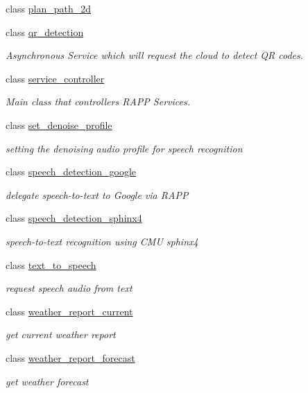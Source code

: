 \begin{DoxyCompactItemize}
\item 
class \hyperlink{classrapp_1_1cloud_1_1plan__path__2d}{plan\-\_\-path\-\_\-2d}
\item 
class \hyperlink{classrapp_1_1cloud_1_1qr__detection}{qr\-\_\-detection}
\begin{DoxyCompactList}\small\item\em Asynchronous Service which will request the cloud to detect Q\-R codes. \end{DoxyCompactList}\item 
class \hyperlink{classrapp_1_1cloud_1_1service__controller}{service\-\_\-controller}
\begin{DoxyCompactList}\small\item\em Main class that controllers R\-A\-P\-P Services. \end{DoxyCompactList}\item 
class \hyperlink{classrapp_1_1cloud_1_1set__denoise__profile}{set\-\_\-denoise\-\_\-profile}
\begin{DoxyCompactList}\small\item\em setting the denoising audio profile for speech recognition \end{DoxyCompactList}\item 
class \hyperlink{classrapp_1_1cloud_1_1speech__detection__google}{speech\-\_\-detection\-\_\-google}
\begin{DoxyCompactList}\small\item\em delegate speech-\/to-\/text to Google via R\-A\-P\-P \end{DoxyCompactList}\item 
class \hyperlink{classrapp_1_1cloud_1_1speech__detection__sphinx4}{speech\-\_\-detection\-\_\-sphinx4}
\begin{DoxyCompactList}\small\item\em speech-\/to-\/text recognition using C\-M\-U sphinx4 \end{DoxyCompactList}\item 
class \hyperlink{classrapp_1_1cloud_1_1text__to__speech}{text\-\_\-to\-\_\-speech}
\begin{DoxyCompactList}\small\item\em request speech audio from text \end{DoxyCompactList}\item 
class \hyperlink{classrapp_1_1cloud_1_1weather__report__current}{weather\-\_\-report\-\_\-current}
\begin{DoxyCompactList}\small\item\em get current weather report \end{DoxyCompactList}\item 
class \hyperlink{classrapp_1_1cloud_1_1weather__report__forecast}{weather\-\_\-report\-\_\-forecast}
\begin{DoxyCompactList}\small\item\em get weather forecast \end{DoxyCompactList}\end{DoxyCompactItemize}
